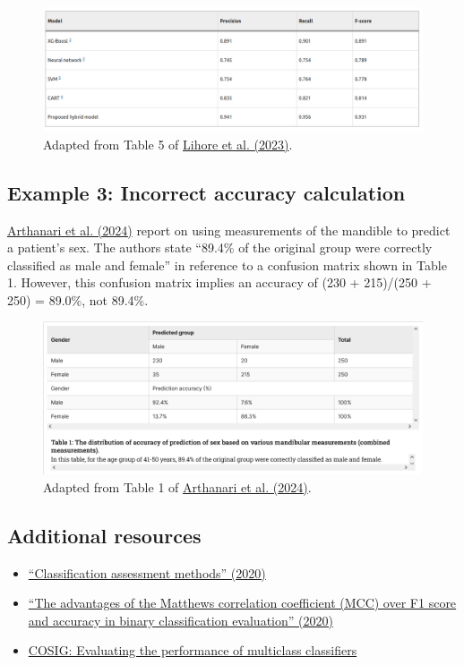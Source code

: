 \documentclass[letterpaper, 12pt]{article}
\begin{document}
\begin{figure}[h!tbp]
    \centering
    \includegraphics[width=\textwidth]{img/binary_classifiers/lihore_f1.png}
    \caption*{Adapted from Table 5 of \href{https://doi.org/10.1038/s41598-023-41314-y}{Lihore et al. (2023)}.}
\end{figure}

\subsection*{Example 3: Incorrect accuracy calculation}

\href{https://doi.org/10.7759/cureus.58500}{Arthanari et al. (2024)} report on using measurements of the mandible to predict a patient's sex. The authors state ``89.4\% of the original group were correctly classified as male and female'' in reference to a confusion matrix shown in Table 1. However, this confusion matrix implies an accuracy of (230 + 215)/(250 + 250) = 89.0\%, not 89.4\%.

\begin{figure}[h!tbp]
    \centering
    \includegraphics[width=\textwidth]{img/binary_classifiers/arthanari_et_al_table_1.png}
    \caption*{Adapted from Table 1 of \href{https://doi.org/10.7759/cureus.58500}{Arthanari et al. (2024)}.}
\end{figure}

\subsection*{Additional resources}

\begin{itemize}
    \setlength\itemsep{-0.5em}
    \item \href{https://doi.org/10.1016/j.aci.2018.08.003}{``Classification assessment methods'' (2020)}
    \item \href{https://doi.org/10.1186/s12864-019-6413-7}{``The advantages of the Matthews correlation coefficient (MCC) over F1 score and accuracy in binary classification evaluation'' (2020)}
    \item  \href{https://osf.io/5x2rp}{COSIG: Evaluating the performance of multiclass classifiers}
\end{itemize}
\end{document}
